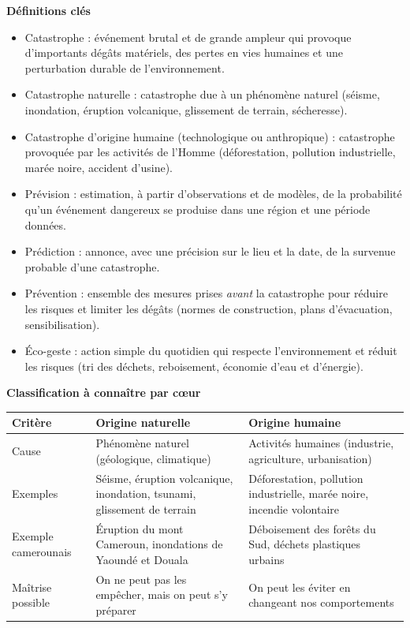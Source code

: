 \documentclass[11pt]{article}
\newcommand{\cle}[1]{{\popxbold\color{popdark}#1}}
\begin{document}
\begin{bilan}
\textbf{Définitions clés}
\begin{itemize}
  \item \cle{Catastrophe} : événement brutal et de grande ampleur qui provoque d'importants dégâts matériels, des pertes en vies humaines et une perturbation durable de l'environnement.
  \item \cle{Catastrophe naturelle} : catastrophe due à un phénomène naturel (séisme, inondation, éruption volcanique, glissement de terrain, sécheresse).
  \item \cle{Catastrophe d'origine humaine} (technologique ou anthropique) : catastrophe provoquée par les activités de l'Homme (déforestation, pollution industrielle, marée noire, accident d'usine).
  \item \cle{Prévision} : estimation, à partir d'observations et de modèles, de la probabilité qu'un événement dangereux se produise dans une région et une période données.
  \item \cle{Prédiction} : annonce, avec une précision sur le lieu et la date, de la survenue probable d'une catastrophe.
  \item \cle{Prévention} : ensemble des mesures prises \emph{avant} la catastrophe pour réduire les risques et limiter les dégâts (normes de construction, plans d'évacuation, sensibilisation).
  \item \cle{Éco-geste} : action simple du quotidien qui respecte l'environnement et réduit les risques (tri des déchets, reboisement, économie d'eau et d'énergie).
\end{itemize}

\textbf{Classification à connaître par c\oe ur}
\begin{center}
\begin{tabularx}{\linewidth}{|l|X|X|}
\hline
\rowcolor{popblueL} \textbf{Critère} & \textbf{Origine naturelle} & \textbf{Origine humaine} \\
\hline
Cause & Phénomène naturel (géologique, climatique) & Activités humaines (industrie, agriculture, urbanisation) \\
\hline
Exemples & Séisme, éruption volcanique, inondation, tsunami, glissement de terrain & Déforestation, pollution industrielle, marée noire, incendie volontaire \\
\hline
Exemple camerounais & Éruption du mont Cameroun, inondations de Yaoundé et Douala & Déboisement des forêts du Sud, déchets plastiques urbains \\
\hline
Maîtrise possible & On ne peut pas les empêcher, mais on peut s'y préparer & On peut les éviter en changeant nos comportements \\
\hline
\end{tabularx}
\end{center}


\end{bilan}
\end{document}
